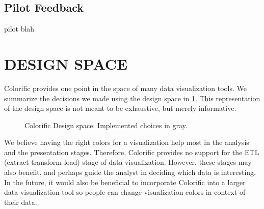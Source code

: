 \documentclass{article}
\newcommand{\system}{Colorific\xspace}
\begin{document}
\begin{center}
\end{center}

\subsection{Pilot Feedback}
pilot blah

\section{DESIGN SPACE}
\system provides one point in the space of many data visualization tools. We summarize the decisions we made using the design space in \ref{design-space}. This representation of the design space is not meant to be exhaustive, but merely informative. 

\begin{figure}
\label{design-space}
\caption{\system Design space. Implemented choices in gray.}
\end{figure}
 We believe having the right colors for a visualization help most in the analysis and the presentation stages. Therefore, \system provides no support for the ETL (extract-transform-load) stage of data visualization. However, these stages may also benefit, and perhaps guide the analyst in deciding which data is interesting. In the future, it would also be beneficial to incorporate \system into a larger data visualization tool so people can change visualization colors in context of their data.
\end{document}

